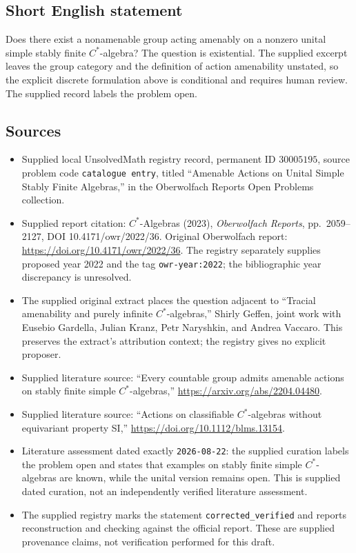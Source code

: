 \documentclass[11pt]{article}
\begin{document}
\subsection{Short English statement}
Does there exist a nonamenable group acting amenably on a nonzero unital simple stably finite \(C^*\)-algebra? The question is existential. The supplied excerpt leaves the group category and the definition of action amenability unstated, so the explicit discrete formulation above is conditional and requires human review. The supplied record labels the problem open.
\subsection{Sources}
\begin{itemize}
\item Supplied local UnsolvedMath registry record, permanent ID \(30005195\), source problem code \texttt{catalogue entry}, titled ``Amenable Actions on Unital Simple Stably Finite Algebras,'' in the Oberwolfach Reports Open Problems collection.
\item Supplied report citation: \(C^*\)-Algebras (2023), \emph{Oberwolfach Reports}, pp.\ 2059--2127, DOI 10.4171/owr/2022/36. Original Oberwolfach report: \url{https://doi.org/10.4171/owr/2022/36}. The registry separately supplies proposed year 2022 and the tag \texttt{owr-year:2022}; the bibliographic year discrepancy is unresolved.
\item The supplied original extract places the question adjacent to ``Tracial amenability and purely infinite \(C^*\)-algebras,'' Shirly Geffen, joint work with Eusebio Gardella, Julian Kranz, Petr Naryshkin, and Andrea Vaccaro. This preserves the extract's attribution context; the registry gives no explicit proposer.
\item Supplied literature source: ``Every countable group admits amenable actions on stably finite simple \(C^*\)-algebras,'' \url{https://arxiv.org/abs/2204.04480}.
\item Supplied literature source: ``Actions on classifiable \(C^*\)-algebras without equivariant property SI,'' \url{https://doi.org/10.1112/blms.13154}.
\item Literature assessment dated exactly \texttt{2026-08-22}: the supplied curation labels the problem open and states that examples on stably finite simple \(C^*\)-algebras are known, while the unital version remains open. This is supplied dated curation, not an independently verified literature assessment.
\item The supplied registry marks the statement \texttt{corrected\_verified} and reports reconstruction and checking against the official report. These are supplied provenance claims, not verification performed for this draft.
\end{itemize}
\end{document}
